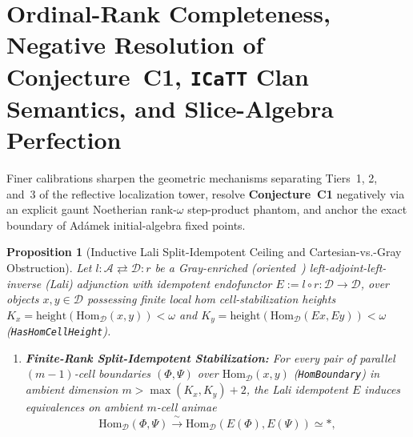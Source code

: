 \documentclass[10pt,twoside,openright]{book}
\theoremstyle{crmplain}
\newtheorem{proposition}[theorem]{Proposition}
\theoremstyle{crmdef}
\theoremstyle{crmremark}
\newcommand{\lean}[1]{\ignorespaces}
\newcommand{\leanwitness}{\ignorespaces}
\begin{document}
\section{\texorpdfstring{Ordinal-Rank Completeness, Negative Resolution of Conjecture~C1, \texttt{ICaTT} Clan Semantics, and Slice-Algebra Perfection}{Ordinal-Rank Completeness, Negative Resolution of Conjecture C1, ICaTT Clan Semantics, and Slice-Algebra Perfection}}\label{subsec:ordinal-rank-icatt-perfection}

Finer calibrations sharpen the geometric mechanisms separating Tiers~1, 2, and~3 of the reflective localization tower, resolve \textbf{Conjecture~C1} negatively via an explicit gaunt Noetherian rank-$\omega$ step-product phantom, and anchor the exact boundary of Ad\'amek initial-algebra fixed points.

\begin{proposition}[Inductive Lali Split-Idempotent Ceiling and Cartesian-vs.-Gray Obstruction]\label{prop:lali-ceiling}%
\lean{HomotopyCRM.globularSim_stabilization_above_height, HomotopyCRM.prop11A_lali_stabilization_above_ceiling, HomotopyCRM.prop11A_ceiling_sharp_at_max_add_two}%
\leanwitness%
%
Let $l : \mathcal{A} \rightleftarrows \mathcal{D} : r$ be a Gray-enriched (oriented~\cite[Definition~3.5.1]{GepnerHeine26}) left-adjoint-left-inverse (\emph{Lali}) adjunction with idempotent endofunctor $E := l \circ r : \mathcal{D} \to \mathcal{D}$, over objects $x, y \in \mathcal{D}$ possessing finite local hom cell-stabilization heights $K_x = \mathrm{height}(\mathrm{Hom}_{\mathcal{D}}(x, y)) < \omega$ and $K_y = \mathrm{height}(\mathrm{Hom}_{\mathcal{D}}(E x, E y)) < \omega$ (\texttt{HasHomCellHeight}).
\begin{enumerate}[label=(\arabic*),leftmargin=2em]
  \item \textbf{Finite-Rank Split-Idempotent Stabilization:} For every pair of parallel $(m-1)$-cell boundaries $(\Phi, \Psi)$ over $\mathrm{Hom}_{\mathcal{D}}(x, y)$ (\texttt{HomBoundary}) in ambient dimension $m > \max(K_x, K_y) + 2$, the Lali idempotent $E$ induces equivalences on ambient $m$-cell animae
  \[
    \mathrm{Hom}_{\mathcal{D}}(\Phi, \Psi) \xrightarrow{\;\sim\;} \mathrm{Hom}_{\mathcal{D}}(E(\Phi), E(\Psi)) \simeq *,
  \]

\end{enumerate}
\end{proposition}
\end{document}
